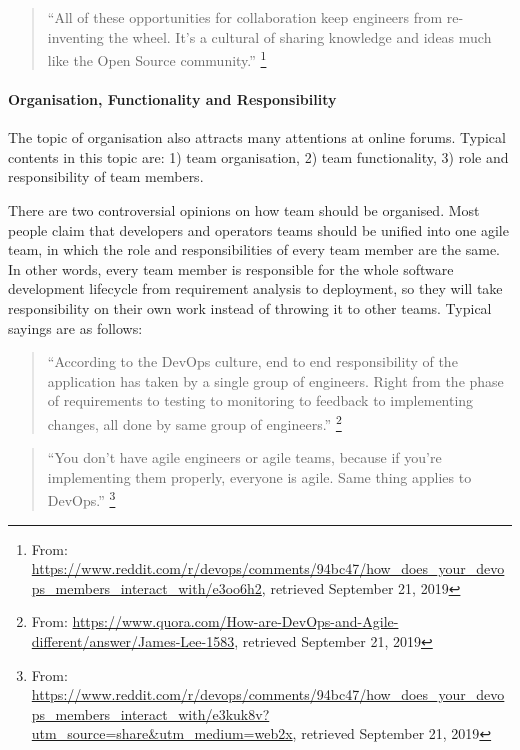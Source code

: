 \documentclass[
  12pt,
  a4paper,
]{article}
\begin{document}
\begin{quote}
``All of these opportunities for collaboration keep engineers from
re-inventing the wheel. It's a cultural of sharing knowledge and ideas
much like the Open Source community.'' \footnote{From:
  \url{https://www.reddit.com/r/devops/comments/94bc47/how_does_your_devops_members_interact_with/e3oo6h2},
  retrieved September 21, 2019}
\end{quote}

\hypertarget{organisation-functionality-and-responsibility}{%
\paragraph{Organisation, Functionality and
Responsibility}\label{organisation-functionality-and-responsibility}}

The topic of organisation also attracts many attentions at online
forums. Typical contents in this topic are: 1) team organisation, 2)
team functionality, 3) role and responsibility of team members.

There are two controversial opinions on how team should be organised.
Most people claim that developers and operators teams should be unified
into one agile team, in which the role and responsibilities of every
team member are the same. In other words, every team member is
responsible for the whole software development lifecycle from
requirement analysis to deployment, so they will take responsibility on
their own work instead of throwing it to other teams. Typical sayings
are as follows:

\begin{quote}
``According to the DevOps culture, end to end responsibility of the
application has taken by a single group of engineers. Right from the
phase of requirements to testing to monitoring to feedback to
implementing changes, all done by same group of engineers.'' \footnote{From:
  \url{https://www.quora.com/How-are-DevOps-and-Agile-different/answer/James-Lee-1583},
  retrieved September 21, 2019}
\end{quote}

\begin{quote}
``You don't have agile engineers or agile teams, because if you're
implementing them properly, everyone is agile. Same thing applies to
DevOps.'' \footnote{From:
  \url{https://www.reddit.com/r/devops/comments/94bc47/how_does_your_devops_members_interact_with/e3kuk8v?utm_source=share\&utm_medium=web2x},
  retrieved September 21, 2019}
\end{quote}
\end{document}
